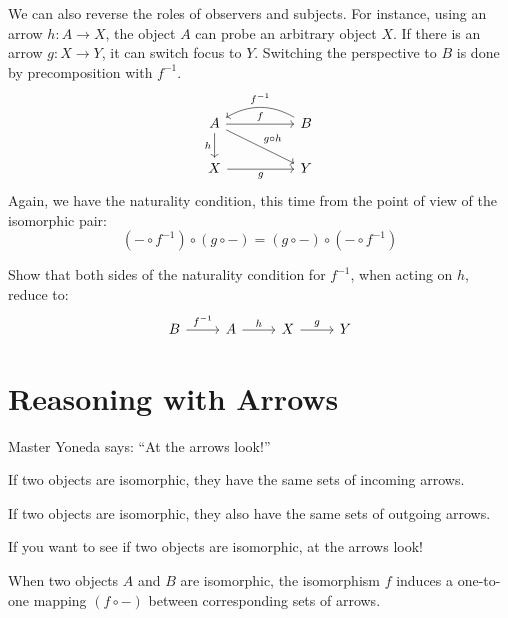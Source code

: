 \documentclass[DaoFP]{subfiles}
\begin{document}
We can also reverse the roles of observers and subjects. For instance, using an arrow $h \colon A \to X$, the object $A$ can probe an arbitrary object $X$. If there is an arrow $g \colon X \to Y$, it can switch focus to $Y$. Switching the perspective to $B$ is done by precomposition with $f^{-1}$.
\[
 \begin{tikzcd}
 A
 \arrow[rr, "f"]
 \arrow[d, "h"']
 \arrow[rrd, "g\circ h"]
 && B
  \arrow[ll, bend right,  "f^{-1}"']
 \\
 X
 \arrow[rr, "g"']
  && Y
 \end{tikzcd}
\]
Again, we have the naturality condition, this time from the point of view of the isomorphic pair:
\[(- \circ f^{-1}) \circ (g \circ -) = (g \circ -) \circ (- \circ f^{-1}) \]

\begin{exercise}
Show that both sides of the naturality condition for $f^{-1}$, when acting on $h$, reduce to:
\[
 \begin{tikzcd}
 B \arrow[r, "f^{-1}"] &A \arrow[r, "h"] & X \arrow[r, "g"] & Y
\end{tikzcd}
\]

\end{exercise}

\section{Reasoning with Arrows}

Master Yoneda says: ``At the arrows look!''

If two objects are isomorphic, they have the same sets of incoming arrows. 

If two objects are isomorphic, they also have the same sets of outgoing arrows.

If you want to see if two objects are isomorphic, at the arrows look!

\medskip

When two objects $A$ and $B$ are isomorphic, the isomorphism $f$ induces a one-to-one mapping $(f \circ -)$ between corresponding sets of arrows.  
\end{document}
